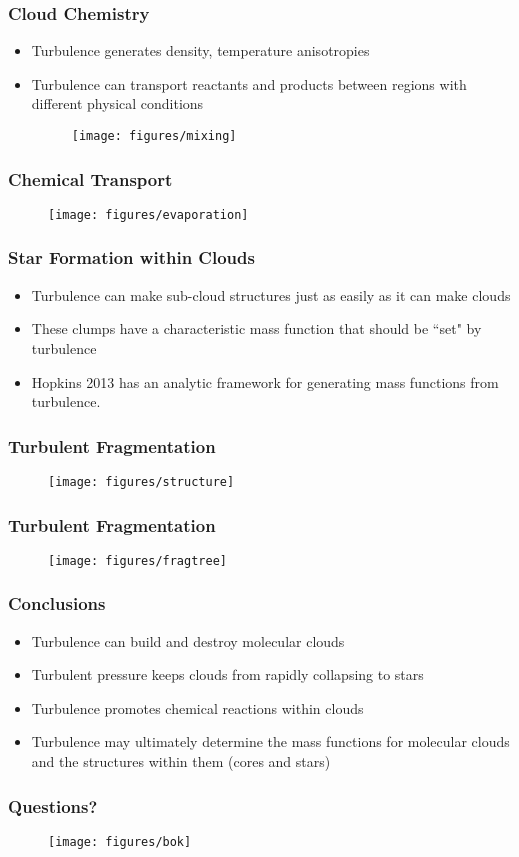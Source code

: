 \documentclass[serif,mathserif]{beamer}
\begin{document}
\begin{frame}
	\frametitle{Cloud Chemistry}
  \begin{itemize}
	  \item Turbulence generates density, temperature anisotropies
	  \item Turbulence can transport reactants and products between regions with
		  different physical conditions
  \begin{figure}[t]
	\centering
	\texttt{[image: figures/mixing]}
  \end{figure}
  \end{itemize}
\end{frame}

\begin{frame}
	\frametitle{Chemical Transport}
  \begin{figure}[t]
	\centering
	\texttt{[image: figures/evaporation]}
  \end{figure}
\end{frame}

\begin{frame}
	\frametitle{Star Formation within Clouds}
  \begin{itemize}
	  \item Turbulence can make sub-cloud structures just as easily as it can
		  make clouds
	  \item These clumps have a characteristic mass function that should be
		  ``set" by turbulence
	  \item Hopkins 2013 has an analytic framework for generating mass functions
		  from turbulence.
  \end{itemize}
\end{frame}

\begin{frame}
	\frametitle{Turbulent Fragmentation}
  \begin{figure}[t]
	\centering
	\texttt{[image: figures/structure]}
  \end{figure}
\end{frame}

\begin{frame}
	\frametitle{Turbulent Fragmentation}
  \begin{figure}[t]
	\centering
	\texttt{[image: figures/fragtree]}
  \end{figure}
\end{frame}

\begin{frame}
  \frametitle{Conclusions}
  \begin{itemize}
	  \item Turbulence can build and destroy molecular clouds
	  \item Turbulent pressure keeps clouds from rapidly collapsing to stars
	  \item Turbulence promotes chemical reactions within clouds
	  \item Turbulence may ultimately determine the mass functions for molecular
		  clouds and the structures within them (cores and stars)
  \end{itemize}
\end{frame}

\begin{frame}
  \frametitle{Questions?}
  \begin{figure}[t]
	\centering
	\texttt{[image: figures/bok]}
  \end{figure}
\end{frame}
\end{document}
